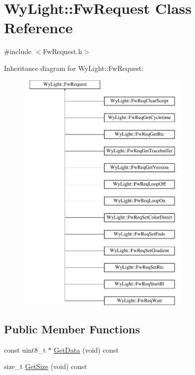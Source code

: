 \hypertarget{class_wy_light_1_1_fw_request}{\section{Wy\-Light\-:\-:Fw\-Request Class Reference}
\label{class_wy_light_1_1_fw_request}
}


{\ttfamily \#include $<$Fw\-Request.\-h$>$}

Inheritance diagram for Wy\-Light\-:\-:Fw\-Request\-:\begin{figure}[H]
\begin{center}
\leavevmode
\includegraphics[height=12.000000cm]{class_wy_light_1_1_fw_request}
\end{center}
\end{figure}
\subsection*{Public Member Functions}
\begin{DoxyCompactItemize}
\item 
const uint8\-\_\-t $\ast$ \hyperlink{class_wy_light_1_1_fw_request_a8302024c799b841d2d6a200c03bfbe46}{Get\-Data} (void) const 
\item 
size\-\_\-t \hyperlink{class_wy_light_1_1_fw_request_a89ec32cb1f337a7bef72f28300a101f0}{Get\-Size} (void) const 
\end{DoxyCompactItemize}
